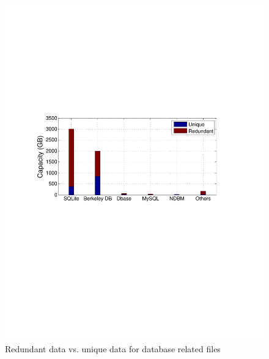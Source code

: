 \begin{figure}[t]
	\centering
	\begin{minipage}{0.35\textwidth}
		\centering
		\includegraphics[width=1\textwidth]{graphs/type-db-cap.pdf}
		\caption{Redundant data vs. unique data for database related files}
		\label{fig-dir}
	\end{minipage}%
	\begin{minipage}{0.278\textwidth}
		\centering

\end{minipage}
\end{figure}
